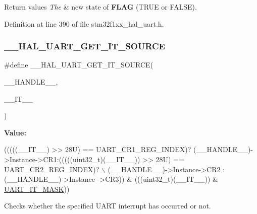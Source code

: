\begin{DoxyRetVals}{Return values}
{\em The} & new state of {\bfseries F\+L\+AG} (T\+R\+UE or F\+A\+L\+SE). \\
\hline
\end{DoxyRetVals}


Definition at line 390 of file stm32f1xx\+\_\+hal\+\_\+uart.\+h.

\mbox{\label{group___u_a_r_t___exported___macros_gab7ad503802bf56bf397c392fc8e18b77}} 
\subsubsection{\texorpdfstring{\+\_\+\+\_\+\+H\+A\+L\+\_\+\+U\+A\+R\+T\+\_\+\+G\+E\+T\+\_\+\+I\+T\+\_\+\+S\+O\+U\+R\+CE}{\_\_HAL\_UART\_GET\_IT\_SOURCE}}
{\footnotesize\ttfamily \#define \+\_\+\+\_\+\+H\+A\+L\+\_\+\+U\+A\+R\+T\+\_\+\+G\+E\+T\+\_\+\+I\+T\+\_\+\+S\+O\+U\+R\+CE(\begin{DoxyParamCaption}\item[{}]{\+\_\+\+\_\+\+H\+A\+N\+D\+L\+E\+\_\+\+\_\+,  }\item[{}]{\+\_\+\+\_\+\+I\+T\+\_\+\+\_\+ }\end{DoxyParamCaption})}

{\bfseries Value\+:}
\begin{DoxyCode}
(((((\_\_IT\_\_) >> 28U) == UART\_CR1\_REG\_INDEX)? (\_\_HANDLE\_\_)->Instance->CR1:(((((uint32\_t)(\_\_IT\_\_)) >> 28U) ==
       UART\_CR2\_REG\_INDEX)? \(\backslash\)
                                                      (\_\_HANDLE\_\_)->Instance->CR2 : (\_\_HANDLE\_\_)->Instance
      ->CR3)) & (((uint32\_t)(\_\_IT\_\_)) & \hyperlink{group___u_a_r_t___private___constants_ga869439269c26e8dee93d49b1c7e67448}{UART\_IT\_MASK}))
\end{DoxyCode}


Checks whether the specified U\+A\+RT interrupt has occurred or not. 



